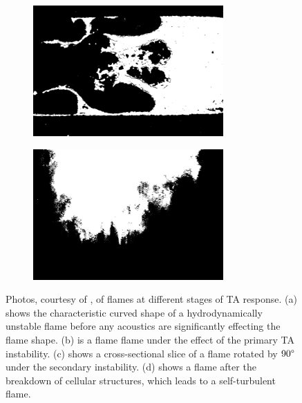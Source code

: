 \begin{figure}[t]
\begin{subfigure}{0.49\textwidth}
\centering
\includegraphics[height=5cm]{assets/imgs/Searby-92-flame_c.png}
\caption{}
\label{fig:Searby-92_flames_c}
\end{subfigure}
\hfill
\begin{subfigure}{0.49\textwidth}
\centering
\includegraphics[height=5cm]{assets/imgs/Searby-92-flame_d.png}
\caption{}
\label{fig:Searby-92_flames_d}
\end{subfigure}
\caption{Photos, courtesy of \cite{searby1992AcousticInstabilityPremixed}, of flames at different stages of TA response. (a) shows the characteristic curved shape of a hydrodynamically unstable flame before any acoustics are significantly effecting the flame shape. (b) is a flame flame under the effect of the primary TA instability. (c) shows a cross-sectional slice of a flame rotated by $90\degree$ under the secondary instability. (d) shows a flame after the breakdown of cellular structures, which leads to a self-turbulent flame.}
\label{fig:Searby-92_flames}
\end{figure}

